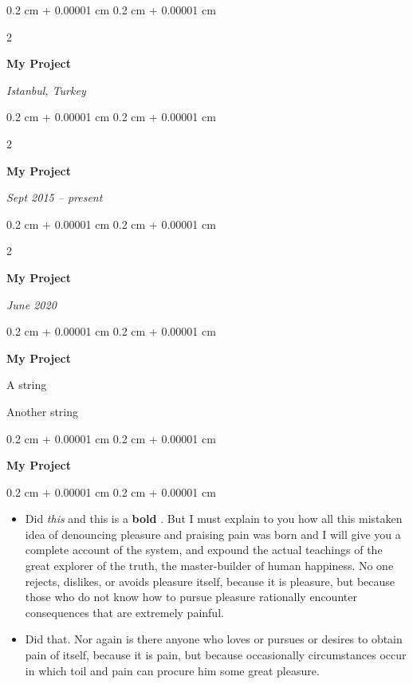 \documentclass[10pt, letterpaper]{article}
\newenvironment{summary}{
    \begin{description}[
        topsep=0.10 cm,
        parsep=0.10 cm,
        partopsep=0pt,
        itemsep=0pt,
        leftmargin=0.4 cm + 10pt
    ]
}{
    \end{description}
} %
\newenvironment{highlights}{
    \begin{itemize}[
        topsep=0.10 cm,
        parsep=0.10 cm,
        partopsep=0pt,
        itemsep=0pt,
        leftmargin=0.4 cm + 10pt
    ]
}{
    \end{itemize}
} %
\newenvironment{onecolentry}{
    \begin{adjustwidth}{
        0.2 cm + 0.00001 cm
    }{
        0.2 cm + 0.00001 cm
    }
}{
    \end{adjustwidth}
} %
\newenvironment{twocolentry}[2][]{
    \onecolentry
    \def\secondColumn{#2}
    \setcolumnwidth{\fill, 4.5 cm}
    \begin{paracol}{2}
}{
    \switchcolumn \raggedleft \secondColumn
    \end{paracol}
    \endonecolentry
} %
\let\hrefWithoutArrow\href
\renewcommand{\href}[2]{\hrefWithoutArrow{#1}{\ifthenelse{\equal{#2}{}}{ }{#2 }\raisebox{.15ex}{\footnotesize \faExternalLink*}}}
\begin{document}
        \vspace{0.2 cm}

        \begin{twocolentry}{
        \textit{Istanbul, Turkey}    
            
        }
            \textbf{My Project}
        \end{twocolentry}


        \vspace{0.2 cm}

        \begin{twocolentry}{
            
            
        \textit{Sept 2015 – present}}
            \textbf{My Project}
        \end{twocolentry}


        \vspace{0.2 cm}

        \begin{twocolentry}{
            
            
        \textit{June 2020}}
            \textbf{My Project}
        \end{twocolentry}


        \vspace{0.2 cm}

        \begin{onecolentry}
            \textbf{My Project}
        \end{onecolentry}
            \begin{summary}
                \item A string
                \item Another string
            \end{summary}


        \vspace{0.2 cm}

        \begin{onecolentry}
            \textbf{My Project}
        \end{onecolentry}
        \vspace{0.10 cm}
        \begin{onecolentry}
            \begin{highlights}
                \item Did \textit{this} and this is a \textbf{bold} \href{https://example.com}{link}. But I must explain to you how all this mistaken idea of denouncing pleasure and praising pain was born and I will give you a complete account of the system, and expound the actual teachings of the great explorer of the truth, the master-builder of human happiness. No one rejects, dislikes, or avoids pleasure itself, because it is pleasure, but because those who do not know how to pursue pleasure rationally encounter consequences that are extremely painful.
                \item Did that. Nor again is there anyone who loves or pursues or desires to obtain pain of itself, because it is pain, but because occasionally circumstances occur in which toil and pain can procure him some great pleasure.
            \end{highlights}
        \end{onecolentry}
\end{document}
